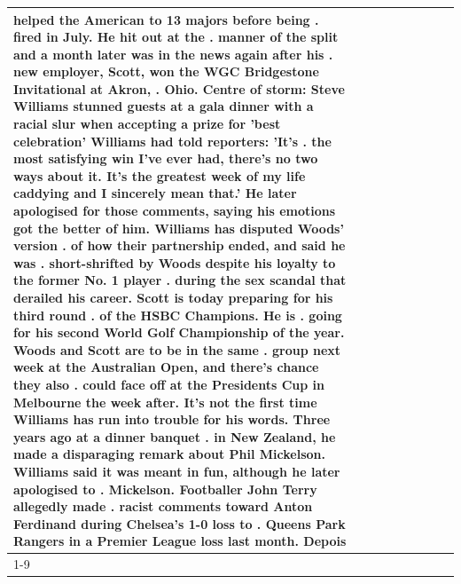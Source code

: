 \begin{table}[H]
\begin{tabular}{lllrlllll}
helped the American to 13 majors before being . fired in July. He hit out at the . manner of the split and a month later was in the news again after his . new employer, Scott, won the WGC Bridgestone Invitational at Akron, . Ohio. Centre of storm: Steve Williams stunned guests at a gala dinner with a racial slur when accepting a prize for 'best celebration' Williams had told reporters: 'It's . the most satisfying win I've ever had, there's no two ways about it. It's the greatest week of my life caddying and I sincerely mean that.' He later apologised for those comments, saying his emotions got the better of him. Williams has disputed Woods' version . of how their partnership ended, and said he was . short-shrifted by Woods despite his loyalty to the former No. 1 player . during the sex scandal that derailed his career. Scott is today preparing for his third round . of the HSBC Champions. He is . going for his second World Golf Championship of the year. Woods and Scott are to be in the same . group next week at the Australian Open, and there's chance they also . could face off at the Presidents Cup in Melbourne the week after. It's not the first time Williams has run into trouble for his words. Three years ago at a dinner banquet . in New Zealand, he made a disparaging remark about Phil Mickelson. Williams said it was meant in fun, although he later apologised to . Mickelson. Footballer John Terry allegedly made . racist comments toward Anton Ferdinand during Chelsea's 1-0 loss to . Queens Park Rangers in a Premier League loss last month. Depois \\
\cline{1-9}

\end{tabular}
\end{table}
